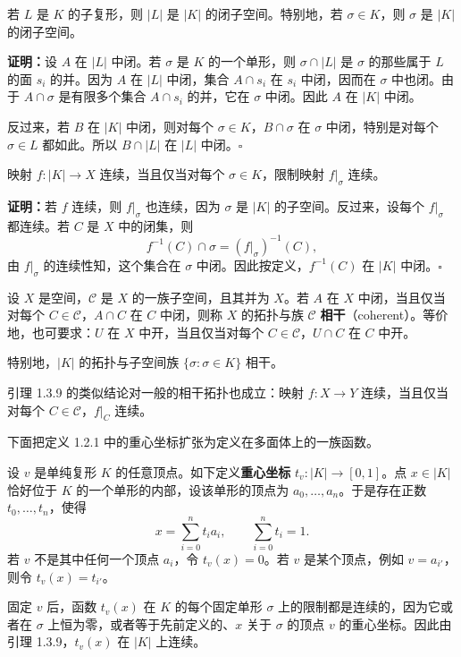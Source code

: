 若 $L$ 是 $K$ 的子复形，则 $|L|$ 是 $|K|$ 的闭子空间。特别地，若 $\sigma\in K$，则 $\sigma$ 是 $|K|$ 的闭子空间。

\noindent\textbf{证明：}设 $A$ 在 $|L|$ 中闭。若 $\sigma$ 是 $K$ 的一个单形，则 $\sigma\cap|L|$ 是 $\sigma$ 的那些属于 $L$ 的面 $s_i$ 的并。因为 $A$ 在 $|L|$ 中闭，集合 $A\cap s_i$ 在 $s_i$ 中闭，因而在 $\sigma$ 中也闭。由于 $A\cap\sigma$ 是有限多个集合 $A\cap s_i$ 的并，它在 $\sigma$ 中闭。因此 $A$ 在 $|K|$ 中闭。

反过来，若 $B$ 在 $|K|$ 中闭，则对每个 $\sigma\in K$，$B\cap\sigma$ 在 $\sigma$ 中闭，特别是对每个 $\sigma\in L$ 都如此。所以 $B\cap|L|$ 在 $|L|$ 中闭。\hfill$\square$

映射 $f:|K|\to X$ 连续，当且仅当对每个 $\sigma\in K$，限制映射 $f|_\sigma$ 连续。

\noindent\textbf{证明：}若 $f$ 连续，则 $f|_\sigma$ 也连续，因为 $\sigma$ 是 $|K|$ 的子空间。反过来，设每个 $f|_\sigma$ 都连续。若 $C$ 是 $X$ 中的闭集，则
\[
f^{-1}(C)\cap\sigma=(f|_\sigma)^{-1}(C),
\]
由 $f|_\sigma$ 的连续性知，这个集合在 $\sigma$ 中闭。因此按定义，$f^{-1}(C)$ 在 $|K|$ 中闭。\hfill$\square$

设 $X$ 是空间，$\mathcal C$ 是 $X$ 的一族子空间，且其并为 $X$。若 $A$ 在 $X$ 中闭，当且仅当对每个 $C\in\mathcal C$，$A\cap C$ 在 $C$ 中闭，则称 $X$ 的拓扑与族 $\mathcal C$ \textbf{相干}（coherent）。等价地，也可要求：$U$ 在 $X$ 中开，当且仅当对每个 $C\in\mathcal C$，$U\cap C$ 在 $C$ 中开。

特别地，$|K|$ 的拓扑与子空间族 $\{\sigma:\sigma\in K\}$ 相干。

引理 1.3.9 的类似结论对一般的相干拓扑也成立：映射 $f:X\to Y$ 连续，当且仅当对每个 $C\in\mathcal C$，$f|_C$ 连续。

下面把定义 1.2.1 中的重心坐标扩张为定义在多面体上的一族函数。

设 $v$ 是单纯复形 $K$ 的任意顶点。如下定义\textbf{重心坐标} $t_v:|K|\to[0,1]$。点 $x\in|K|$ 恰好位于 $K$ 的一个单形的内部，设该单形的顶点为 $a_0,\ldots,a_n$。于是存在正数 $t_0,\ldots,t_n$，使得
\[
x=\sum_{i=0}^n t_i a_i,\qquad \sum_{i=0}^n t_i=1.
\]
若 $v$ 不是其中任何一个顶点 $a_i$，令 $t_v(x)=0$。若 $v$ 是某个顶点，例如 $v=a_{i'}$，则令 $t_v(x)=t_{i'}$。

固定 $v$ 后，函数 $t_v(x)$ 在 $K$ 的每个固定单形 $\sigma$ 上的限制都是连续的，因为它或者在 $\sigma$ 上恒为零，或者等于先前定义的、$x$ 关于 $\sigma$ 的顶点 $v$ 的重心坐标。因此由引理 1.3.9，$t_v(x)$ 在 $|K|$ 上连续。

